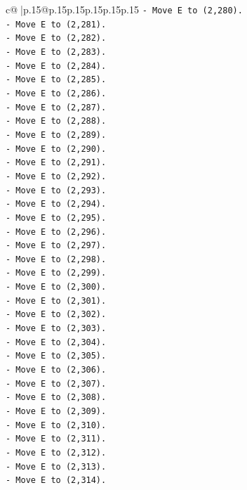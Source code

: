 \documentclass{article}
\begin{document}
{\begin{supertabular}{c@{$\;$}|p{.15\linewidth}@{}p{.15\linewidth}p{.15\linewidth}p{.15\linewidth}p{.15\linewidth}p{.15\linewidth}}
{{{\texttt{{-} Move E to (2,280).} \\
\texttt{{-} Move E to (2,281).} \\
\texttt{{-} Move E to (2,282).} \\
\texttt{{-} Move E to (2,283).} \\
\texttt{{-} Move E to (2,284).} \\
\texttt{{-} Move E to (2,285).} \\
\texttt{{-} Move E to (2,286).} \\
\texttt{{-} Move E to (2,287).} \\
\texttt{{-} Move E to (2,288).} \\
\texttt{{-} Move E to (2,289).} \\
\texttt{{-} Move E to (2,290).} \\
\texttt{{-} Move E to (2,291).} \\
\texttt{{-} Move E to (2,292).} \\
\texttt{{-} Move E to (2,293).} \\
\texttt{{-} Move E to (2,294).} \\
\texttt{{-} Move E to (2,295).} \\
\texttt{{-} Move E to (2,296).} \\
\texttt{{-} Move E to (2,297).} \\
\texttt{{-} Move E to (2,298).} \\
\texttt{{-} Move E to (2,299).} \\
\texttt{{-} Move E to (2,300).} \\
\texttt{{-} Move E to (2,301).} \\
\texttt{{-} Move E to (2,302).} \\
\texttt{{-} Move E to (2,303).} \\
\texttt{{-} Move E to (2,304).} \\
\texttt{{-} Move E to (2,305).} \\
\texttt{{-} Move E to (2,306).} \\
\texttt{{-} Move E to (2,307).} \\
\texttt{{-} Move E to (2,308).} \\
\texttt{{-} Move E to (2,309).} \\
\texttt{{-} Move E to (2,310).} \\
\texttt{{-} Move E to (2,311).} \\
\texttt{{-} Move E to (2,312).} \\
\texttt{{-} Move E to (2,313).} \\
\texttt{{-} Move E to (2,314).} \\
}}}
\end{supertabular}}
\end{document}
